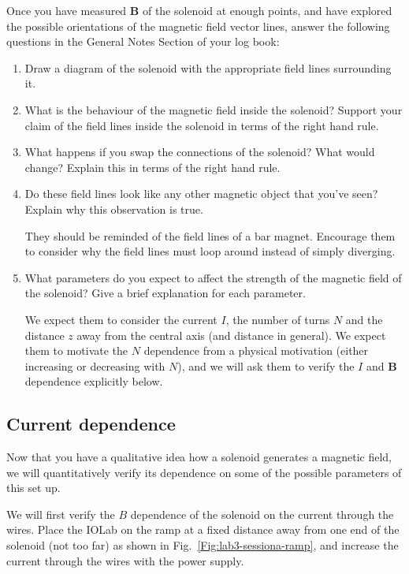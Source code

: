 \documentclass[12pt]{report}
\begin{document}
Once you have measured $\mathbf{B}$ of the solenoid at enough points, and have explored the possible orientations of the magnetic field vector lines, {\color{blue}answer the following questions in the General Notes Section of your log book:}
\begin{enumerate}
\item Draw a diagram of the solenoid with the appropriate field lines surrounding it.

\item What is the behaviour of the magnetic field inside the solenoid? Support your claim of the field lines inside the solenoid in terms of the right hand rule.
\item What happens if you swap the connections of the solenoid? What would change? Explain this in terms of the right hand rule.
\item Do these field lines look like any other magnetic object that you've seen? Explain why this observation is true.

\begin{tcolorbox}
They should be reminded of the field lines of a bar magnet. Encourage them to consider why the field lines must loop around instead of simply diverging.
\end{tcolorbox}

\item What parameters do you expect to affect the strength of the magnetic field of the solenoid? Give a brief explanation for each parameter.

\begin{tcolorbox}
We expect them to consider the current $I$, the number of turns $N$ and the distance $z$ away from the central axis (and distance in general). We expect them to motivate the $N$ dependence from a physical motivation (either increasing or decreasing with $N$), and we will ask them to verify the $I$ and $\textbf{B}$ dependence explicitly below.
\end{tcolorbox}

\end{enumerate}

\subsection{Current dependence}
Now that you have a qualitative idea how a solenoid generates a magnetic field, we will quantitatively verify its dependence on some of the possible parameters of this set up.

We will first verify the $B$ dependence of the solenoid on the current through the wires. Place the IOLab on the ramp at a fixed distance away from one end of the solenoid (not too far) as shown in Fig.~\ref{Fig:lab3-sessiona-ramp}, and increase the current through the wires with the power supply. 
\end{document}
